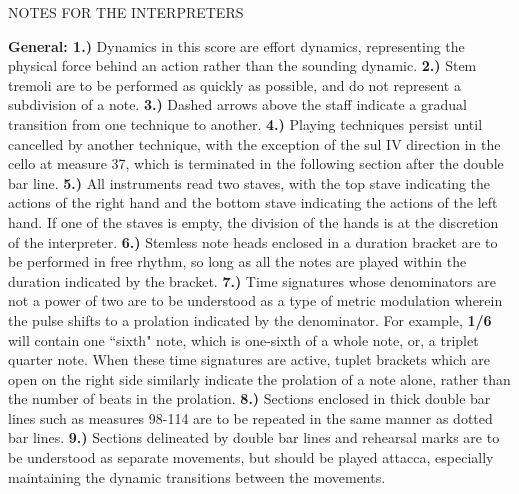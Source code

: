 \documentclass[11pt]{article}
\begin{document}
\begingroup
\begin{center}
\huge 
\end{center}
\endgroup

\begingroup
\begin{center}
\huge NOTES FOR THE INTERPRETERS
\end{center}
\endgroup

\begingroup
\begin{center}
\textbf{General: 1.)} Dynamics in this score are effort dynamics, representing the physical force behind an action rather than the sounding dynamic. \textbf{2.)} Stem tremoli are to be performed as quickly as possible, and do not represent a subdivision of a note. \textbf{3.)} Dashed arrows above the staff indicate a gradual transition from one technique to another. \textbf{4.)}  Playing techniques persist until cancelled by another technique, with the exception of the sul IV direction in the cello at measure 37, which is terminated in the following section after the double bar line. \textbf{5.)}  All instruments read two staves, with the top stave indicating the actions of the right hand and the bottom stave indicating the actions of the left hand. If one of the staves is empty, the division of the hands is at the discretion of the interpreter. \textbf{6.)} Stemless note heads enclosed in a duration bracket are to be performed in free rhythm, so long as all the notes are played within the duration indicated by the bracket. \textbf{7.)} Time signatures whose denominators are not a power of two are to be understood as a type of metric modulation wherein the pulse shifts to a prolation indicated by the denominator. For example, \textbf{1/6} will contain one ``sixth" note, which is one-sixth of a whole note, or, a triplet quarter note. When these time signatures are active, tuplet brackets which are open on the right side similarly indicate the prolation of a note alone, rather than the number of beats in the prolation. \textbf{8.)} Sections enclosed in thick double bar lines such as measures 98-114 are to be repeated in the same manner as dotted bar lines. \textbf{9.)} Sections delineated by double bar lines and rehearsal marks are to be understood as separate movements, but should be played attacca, especially maintaining the dynamic transitions between the movements.\\
\rightskip\leftskip
\end{center}
\endgroup
\end{document}
